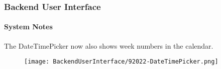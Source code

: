 %

\begin{frame}[fragile]
	\frametitle{Backend User Interface}
	\framesubtitle{System Notes}

	The DateTimePicker now also shows week numbers in the calendar.

	\begin{figure}
		\texttt{[image: BackendUserInterface/92022-DateTimePicker.png]}
	\end{figure}

\end{frame}

